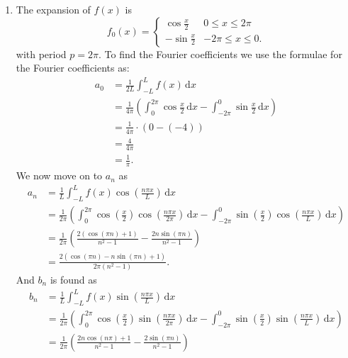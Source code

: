 \begin{derivation}
\begin{enumerate}
  \item   The expansion of $f(x)$ is
  \begin{equation*}
    f_0(x) = \begin{cases}
      \cos \frac{x}{2} & 0 \leq x \leq 2\pi\\
    - \sin  \frac{x}{2} & -2 \pi \leq x \leq 0
    .\end{cases}
  \end{equation*} 
  with period $p = 2\pi$.
  To find the Fourier coefficients we use the formulae for the Fourier coefficients as:
  \begin{align*}
    a_0 &= \frac{1}{2L} \int_{-L}^{L} f(x) \, \mathrm{d}x  \\
    &= \frac{1}{4\pi} \left( \int_{0}^{2\pi} \cos \frac{x}{2} \, \mathrm{d}x - \int_{-2\pi}^{0} \sin \frac{x}{2} \, \mathrm{d}x \right) \\
    &= \frac{1}{4\pi} \cdot (0- (-4)) \\
    &= \frac{4}{4\pi} \\
    &= \frac{1}{\pi}
  .\end{align*}
  We now move on to $a_n$ as
  \begin{align*}
    a_n  &= \frac{1}{L} \int_{-L}^{L} f(x) \cos \left( \frac{n \pi x}{L} \right) \, \mathrm{d}x  \\
    &= \frac{1}{2\pi} \left( \int_{0}^{2\pi} \cos \left( \frac{x}{2} \right) \cos \left( \frac{n \pi x}{2\pi} \right) \, \mathrm{d}x - \int_{-2\pi}^{0} \sin \left( \frac{x}{2} \right) \cos \left( \frac{n \pi x}{L} \right) \, \mathrm{d}x  \right) \\
    &= \frac{1}{2\pi} \left(\frac{2 \left( \cos(\pi n) +  1\right)}{n^2-1} - \frac{2n \sin(\pi n)}{n^2 - 1} \right) \\
    &= \frac{2 (\cos (\pi n) - n \sin(\pi n) + 1)}{2\pi (n^2 - 1)}
  .\end{align*}
  And $b_n$ is found as
  \begin{align*}
    b_n  &= \frac{1}{L} \int_{-L}^{L} f(x) \sin \left( \frac{n \pi x}{L} \right) \, \mathrm{d}x  \\
    &= \frac{1}{2\pi} \left( \int_{0}^{2\pi} \cos \left( \frac{x}{2} \right) \sin \left( \frac{n \pi x}{2\pi} \right) \, \mathrm{d}x - \int_{-2\pi}^{0} \sin \left( \frac{x}{2} \right) \sin \left( \frac{n \pi x}{L} \right) \, \mathrm{d}x  \right) \\
    &= \frac{1}{2\pi} \left( \frac{2n \cos(n\pi)+ 1}{n^2 - 1} - \frac{2 \sin(\pi n)}{n^2-1} \right) \\

\end{align*}
\end{enumerate}
\end{derivation}
